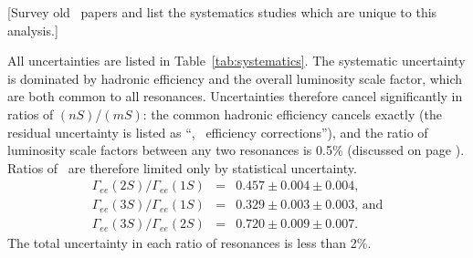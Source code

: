 \documentclass{cornell}
\begin{document}
[Survey old \gee\ papers and list the systematics studies which are
unique to this analysis.]

All uncertainties are listed in Table~\ref{tab:systematics}.  The
systematic uncertainty is dominated by hadronic efficiency and the
overall luminosity scale factor, which are both common to all
resonances.  Uncertainties therefore cancel significantly in ratios of
\gee$(nS)$/\gee$(mS)$: the common hadronic efficiency cancels exactly
(the residual uncertainty is listed as ``\uss, \usss\ efficiency
corrections''), and the ratio of luminosity scale factors between any
two resonances is 0.5\% (discussed on page \pageref{sec:luminosity}).
Ratios of \gee\ are therefore limited only by statistical uncertainty.
\begin{eqnarray}
  \Gamma_{ee}(2S)/\Gamma_{ee}(1S) &=& 0.457 \pm 0.004 \pm 0.004 \mbox{,} \\
  \Gamma_{ee}(3S)/\Gamma_{ee}(1S) &=& 0.329 \pm 0.003 \pm 0.003 \mbox{, and} \\
  \Gamma_{ee}(3S)/\Gamma_{ee}(2S) &=& 0.720 \pm 0.009 \pm 0.007 \mbox{.}
\end{eqnarray}
The total uncertainty in each ratio of resonances is less than 2\%.
\end{document}
